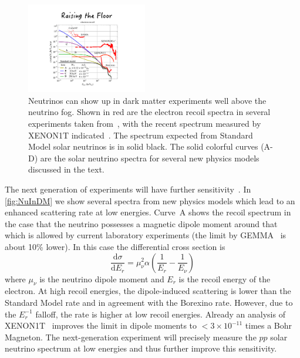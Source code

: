 \begin{figure}[!htbp]
\centering
\includegraphics[width=0.47\textwidth]{fig_nu_in_dm.pdf}
\caption{\label{fig:NuInDM} Neutrinos can show up in dark matter experiments well above the neutrino fog. Shown in red are the electron recoil spectra in several experiments taken from~\cite{Harnik:2012ni}, with the recent spectrum measured by XENON1T indicated~\cite{Aprile:2017aty}. The spectrum expected from Standard Model solar neutrinos is in solid black. The solid colorful curves (A-D) are the solar neutrino spectra for several new physics models discussed in the text.}
\end{figure}

The next generation of experiments will have further sensitivity~\cite{Jeong:2021ivd,Babu:2021jnu}. In \autoref{fig:NuInDM} we show several spectra from new physics models which lead to an enhanced scattering rate at low energies. Curve~A shows the recoil spectrum in the case that the neutrino possesses a magnetic dipole moment around that which is allowed by current laboratory experiments (the limit by GEMMA~\cite{Beda:2012zz} is about 10\% lower). In this case the differential cross section is
\begin{equation}
\frac{\mathrm{d}\sigma}{\mathrm{d}E_r}= \mu_\nu^2 \alpha \left(\frac{1}{E_r}-\frac{1}{E_\nu}\right)
\end{equation}
where $\mu_\nu$ is the neutrino dipole moment and $E_r$ is the recoil energy of the electron. At high recoil energies, the dipole-induced scattering is lower than the Standard Model rate and in agreement with the Borexino rate. However, due to the $E_r^{-1}$ falloff, the rate is higher at low recoil energies. Already an analysis of XENON1T~\cite{Aprile:2020tmw} improves the limit in dipole moments to $<3\times 10^{-11}$ times a Bohr Magneton. The next-generation experiment will precisely measure the $pp$ solar neutrino spectrum at low energies and thus further improve this sensitivity.

